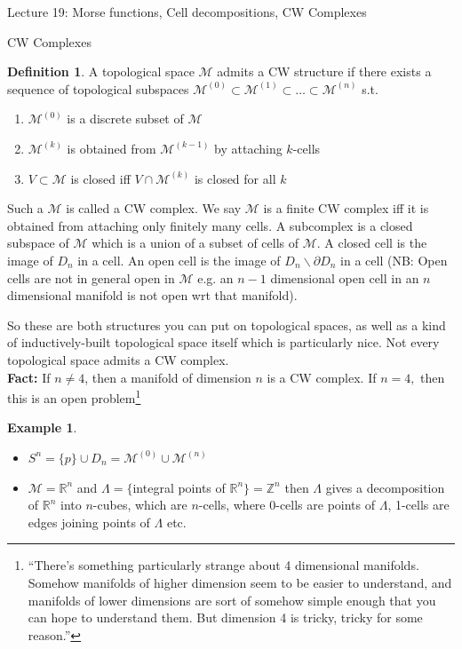 \documentclass[10pt]{article}
\theoremstyle{plain}
\theoremstyle{definition}
\newtheorem{defn}[thm]{Definition} %
\newtheorem{exmp}[thm]{Example} %
\newcommand{\Fact}{\textbf{Fact: }}
\newcommand{\Real}{\mathbb{R}}
\newcommand{\man}{\mathcal{M}}
\begin{document}
\begin{section}{Lecture 19: Morse functions, Cell decompositions, CW Complexes}
\begin{subsection}{CW Complexes}
\begin{defn}
    A topological space $\man$ admits a CW structure if there exists a sequence of topological subspaces $\man^{(0)} \subset \man^{(1)}  \subset \ldots \subset \man^{(n)}$ s.t.
    \begin{enumerate}
        \item $\man^{(0)}$ is a discrete subset of $\man$
        \item $\man^{(k)}$ is obtained from $\man^{(k-1)}$ by attaching $k$-cells
        \item $V\subset \man$ is closed iff $V\cap \man^{(k)}$ is closed for all $k$
    \end{enumerate}
    Such a $\man$ is called a CW complex. We say $\man$ is a finite CW complex iff it is obtained from attaching only finitely many cells. A subcomplex is a closed subspace of $\man$ which is a union of a subset of cells of $\man$. A closed cell is the image of $D_n$ in a cell. An open cell is the image of $D_n\backslash \partial D_n$ in a cell (NB: Open cells are not in general open in $\man$ e.g. an $n-1$ dimensional open cell in an $n$ dimensional manifold is not open wrt that manifold).
\end{defn}
\noindent
So these are both structures you can put on topological spaces, as well as a kind of inductively-built topological space itself which is particularly nice. Not every topological space admits a CW complex.\\
\Fact If $n\neq 4$, then a manifold of dimension $n$ is a CW complex. If $n=4,$ then this is an open problem\footnote{``There's something particularly strange about 4 dimensional manifolds. Somehow manifolds of higher dimension seem to be easier to understand, and manifolds of lower dimensions are sort of somehow simple enough that you can hope to understand them. But dimension 4 is tricky, tricky for some reason.''}
\begin{exmp}
    \begin{itemize}
        \item $S^n = \{p\}\cup D_n = \man^{(0)}\cup \man^{(n)}$
        \item $\man = \Real^n$ and $\Lambda = \{$integral points of $\Real^n\} =\mathbb{Z}^n$ then $\Lambda$ gives a decomposition of $\Real^n$ into $n$-cubes, which are $n$-cells, where 0-cells are points of $\Lambda$, 1-cells are edges joining points of $\Lambda$ etc.
    \end{itemize}
\end{exmp}


\end{subsection}
\end{section}
\end{document}
